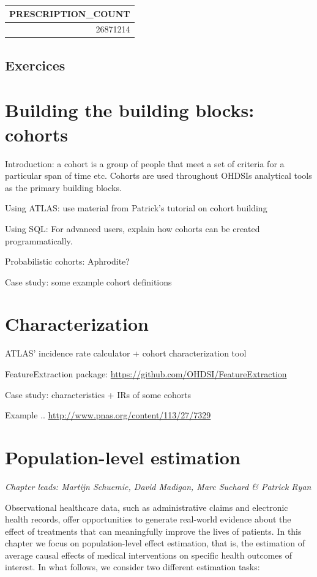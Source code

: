 \documentclass[]{book}
\begin{document}
\begin{longtable}[]{@{}r@{}}
\toprule
PRESCRIPTION\_COUNT\tabularnewline
\midrule
\endhead
26871214\tabularnewline
\bottomrule
\end{longtable}

\section{Exercices}\label{exercices}

\chapter{Building the building blocks: cohorts}\label{Cohorts}

Introduction: a cohort is a group of people that meet a set of criteria
for a particular span of time etc. Cohorts are used throughout OHDSIs
analytical tools as the primary building blocks.

Using ATLAS: use material from Patrick's tutorial on cohort building

Using SQL: For advanced users, explain how cohorts can be created
programmatically.

Probabilistic cohorts: Aphrodite?

Case study: some example cohort definitions

\chapter{Characterization}\label{Characterization}

ATLAS' incidence rate calculator + cohort characterization tool

FeatureExtraction package:
\url{https://github.com/OHDSI/FeatureExtraction}

Case study: characteristics + IRs of some cohorts

Example .. \url{http://www.pnas.org/content/113/27/7329}

\chapter{Population-level estimation}\label{PopulationLevelEstimation}

\emph{Chapter leads: Martijn Schuemie, David Madigan, Marc Suchard \&
Patrick Ryan}

Observational healthcare data, such as administrative claims and
electronic health records, offer opportunities to generate real-world
evidence about the effect of treatments that can meaningfully improve
the lives of patients. In this chapter we focus on population-level
effect estimation, that is, the estimation of average causal effects of
medical interventions on specific health outcomes of interest. In what
follows, we consider two different estimation tasks:
\end{document}
